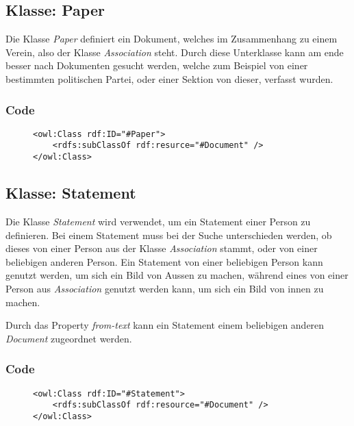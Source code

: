 \documentclass[
    11pt,
    latin1,
    a4paper,
    oneside
]{scrreprt}
\begin{document}
\subsection{Klasse: Paper} \label{sec:class_paper}

Die Klasse \emph{Paper} definiert ein Dokument, welches im Zusammenhang zu einem Verein, also der Klasse \emph{Association} steht. Durch diese Unterklasse kann am ende besser nach Dokumenten gesucht werden, welche zum Beispiel von einer bestimmten politischen Partei, oder einer Sektion von dieser, verfasst wurden.

\subsubsection{Code} \label{sec:class_paper_code}

\begin{figure}[h]
 \lstset{language=XML}
 \begin{lstlisting}[label=owl:word]
<owl:Class rdf:ID="#Paper">
	<rdfs:subClassOf rdf:resurce="#Document" />
</owl:Class>
 \end{lstlisting}
\end{figure}


\subsection{Klasse: Statement} \label{sec:class_statement}

Die Klasse \emph{Statement} wird verwendet, um ein Statement einer Person zu definieren. Bei einem Statement muss bei der Suche unterschieden werden, ob dieses von einer Person aus der Klasse \emph{Association} stammt, oder von einer beliebigen anderen Person. Ein Statement von einer beliebigen Person kann genutzt werden, um sich ein Bild von Aussen zu machen, w\"ahrend eines von einer Person aus \emph{Association} genutzt werden kann, um sich ein Bild von innen zu machen.

Durch das Property \emph{from-text} kann ein Statement einem beliebigen anderen \emph{Document} zugeordnet werden.

\subsubsection{Code} \label{sec:class_statement_code}

\begin{figure}[h]
 \lstset{language=XML}
 \begin{lstlisting}[label=owl:word]
<owl:Class rdf:ID="#Statement">
    <rdfs:subClassOf rdf:resource="#Document" />
</owl:Class>
 \end{lstlisting}
\end{figure}
\end{document}
